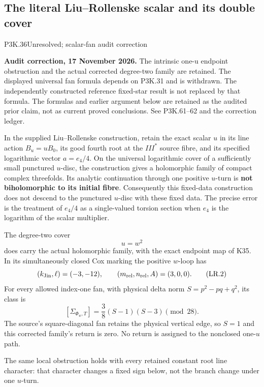 \subsection{The literal Liu--Rollenske scalar and its double cover}
\begin{statement}{P3K.36}{Unresolved; scalar-fan audit correction}
\par\noindent\textbf{Audit correction, 17 November 2026.} The intrinsic one-u endpoint obstruction and the actual corrected degree-two family are retained. The displayed universal fan formula depends on P3K.31 and is withdrawn. The independently constructed reference fixed-star result is not replaced by that formula. The formulas and earlier argument below are retained as the audited prior claim, not as current proved conclusions. See P3K.61--62 and the correction ledger.
\medskip

In the supplied Liu--Rollenske construction, retain the exact scalar
\(u\) in its line action \(B_u=uB_0\), its good fourth root at the
\(III^*\) source fibre, and its specified logarithmic vector
\(a=e_4/4\). On the universal logarithmic cover of a sufficiently small
punctured \(u\)-disc, the construction gives a holomorphic family of
compact complex threefolds. Its analytic continuation through one
positive \(u\)-turn is \textbf{not biholomorphic to its initial fibre}.
Consequently this fixed-data construction does not descend to the
punctured \(u\)-disc with these fixed data. The precise error is the treatment of
\(e_4/4\) as a single-valued torsion section when \(e_4\) is the
logarithm of the scalar multiplier.

The degree-two cover
\[
                         u=w^2                                      \tag{LR.1}
\]
does carry the actual holomorphic family, with the exact endpoint map
of K35. In its simultaneously closed Cox marking the positive
\(w\)-loop has
\[
 (k_{\rm Jin},\ell)=(-3,-12),\qquad
 (m_{\rm rel},n_{\rm rel},A)=(3,0,0).                 \tag{LR.2}
\]
For every allowed index-one fan, with physical delta norm
\(S=p^2-pq+q^2\), its class is
\[
       [\Sigma_{\Phi_w,T}]
              =\frac38(S-1)(S-3)\pmod {28}.           \tag{LR.3}
\]
The source's square-diagonal fan retains the physical vertical edge,
so \(S=1\) and this corrected family's return is zero. No return is
assigned to the nonclosed one-\(u\) path.

The same local obstruction holds with every retained constant root
line character: that character changes a fixed sign below, not the
branch change under one \(u\)-turn.

\end{statement}
